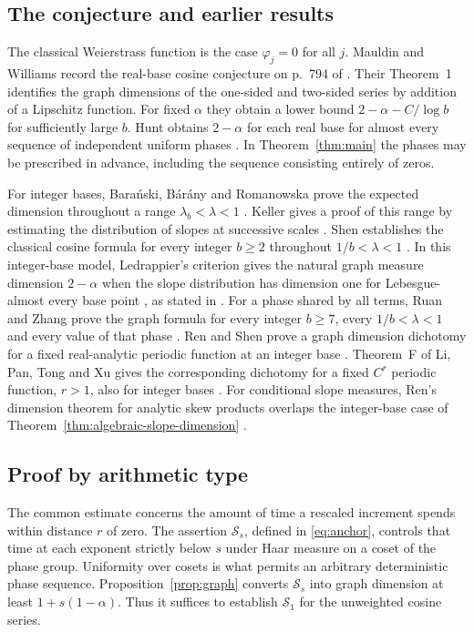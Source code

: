 \documentclass[11pt,a4paper]{article}
\begin{document}
\subsection{The conjecture and earlier results}\label{sec:history}
The classical Weierstrass function is the case $\varphi_j=0$ for all $j$.
Mauldin and Williams record the real-base cosine conjecture on p.~794
of \cite{mw}. Their Theorem~1 identifies the graph dimensions of the
one-sided and two-sided series by addition of a Lipschitz function.
For fixed $\alpha$ they obtain a lower bound $2-\alpha-C/\log b$ for
sufficiently large $b$. Hunt obtains $2-\alpha$ for each real base
for almost every sequence of independent uniform phases \cite{hunt}.
In Theorem~\ref{thm:main} the phases may be prescribed in advance,
including the sequence consisting entirely of zeros.

For integer bases, Bara\'nski, B\'ar\'any and Romanowska prove
the expected dimension throughout a range $\lambda_b<\lambda<1$
\cite{bbr}. Keller gives a proof of this range by estimating the
distribution of slopes at successive scales \cite{keller}. Shen
establishes the classical cosine formula for every integer $b\ge2$
throughout $1/b<\lambda<1$ \cite{shen}. In this integer-base model,
Ledrappier's criterion gives the natural graph measure dimension
$2-\alpha$ when the slope distribution has dimension one for
Lebesgue-almost every base point \cite{ledrappier}, as stated in
\cite[Theorem~2.2 and Corollary~2.3]{bbr}.
For a phase shared by all terms, Ruan and Zhang prove the graph
formula for every integer $b\ge7$, every $1/b<\lambda<1$ and every
value of that phase \cite[Theorem~1.1]{rz}. Ren and Shen prove a graph
dimension dichotomy for a fixed real-analytic periodic function at an
integer base \cite{rs}. Theorem~F of Li, Pan, Tong and Xu gives the
corresponding dichotomy for a fixed $C^r$ periodic function, $r>1$,
also for integer bases \cite{lptx}. For conditional slope measures,
Ren's dimension theorem for analytic skew products overlaps the
integer-base case of Theorem~\ref{thm:algebraic-slope-dimension}
\cite{ren}.

\subsection{Proof by arithmetic type}\label{sec:routes}
The common estimate concerns the amount of time a rescaled increment
spends within distance $r$ of zero. The assertion $\mathcal S_s$,
defined in \eqref{eq:anchor}, controls that time at each exponent
strictly below $s$ under Haar measure on a coset of the phase group.
Uniformity over cosets is what permits an arbitrary deterministic
phase sequence. Proposition~\ref{prop:graph} converts $\mathcal S_s$
into graph dimension at least $1+s(1-\alpha)$. Thus it suffices
to establish $\mathcal S_1$ for the unweighted cosine series.
\end{document}
